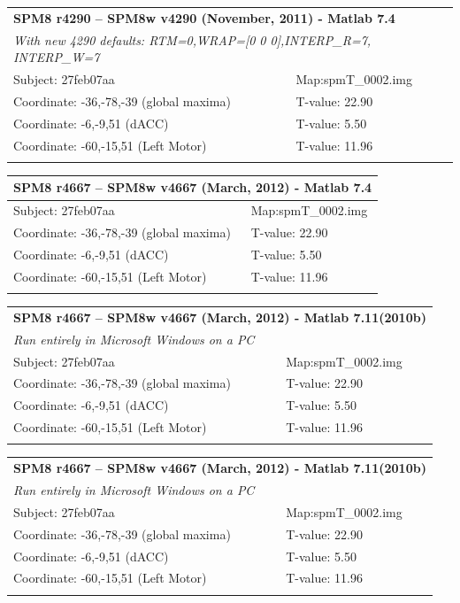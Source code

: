 \documentclass[12pt]{article}
\begin{document}
\begin{center}
\begin{tabular}{ll}
	\hline
	\multicolumn{2}{l}{\textbf{SPM8 r4290 -- SPM8w v4290 (November, 2011) - Matlab 7.4}}\\
	\multicolumn{2}{l}{\textit{With new 4290 defaults: RTM=0,WRAP=[0 0 0],INTERP\_R=7, INTERP\_W=7}}\\
	\hline
	Subject: 27feb07aa & Map:spmT\_0002.img\\
	\hline
	Coordinate: -36,-78,-39 (global maxima) & T-value: 22.90\\
	Coordinate: -6,-9,51 (dACC) & T-value: 5.50\\
	Coordinate: -60,-15,51 (Left Motor) & T-value: 11.96\\
	\hline \\
\end{tabular}

\begin{tabular}{ll}
	\hline
	\multicolumn{2}{l}{\textbf{SPM8 r4667 -- SPM8w v4667 (March, 2012) - Matlab 7.4}}\\
	\hline
	Subject: 27feb07aa & Map:spmT\_0002.img\\
	\hline
	Coordinate: -36,-78,-39 (global maxima) & T-value: 22.90\\
	Coordinate: -6,-9,51 (dACC) & T-value: 5.50\\
	Coordinate: -60,-15,51 (Left Motor) & T-value: 11.96\\
	\hline \\
\end{tabular}

\begin{tabular}{ll}
	\hline
	\multicolumn{2}{l}{\textbf{SPM8 r4667 -- SPM8w v4667 (March, 2012) - Matlab 7.11(2010b)}}\\
	\multicolumn{2}{l}{\textit{Run entirely in Microsoft Windows on a PC}}\\
	\hline
	Subject: 27feb07aa & Map:spmT\_0002.img \\
	\hline
	Coordinate: -36,-78,-39 (global maxima) & T-value: 22.90\\
	Coordinate: -6,-9,51 (dACC) & T-value: 5.50\\
	Coordinate: -60,-15,51 (Left Motor) & T-value: 11.96\\
	\hline \\
\end{tabular}

\begin{tabular}{ll}
	\hline
	\multicolumn{2}{l}{\textbf{SPM8 r4667 -- SPM8w v4667 (March, 2012) - Matlab 7.11(2010b)}}\\
	\multicolumn{2}{l}{\textit{Run entirely in Microsoft Windows on a PC}}\\
	\hline
	Subject: 27feb07aa & Map:spmT\_0002.img \\
	\hline
	Coordinate: -36,-78,-39 (global maxima) & T-value: 22.90\\
	Coordinate: -6,-9,51 (dACC) & T-value: 5.50\\
	Coordinate: -60,-15,51 (Left Motor) & T-value: 11.96\\
	\hline \\
\end{tabular}


\end{center}
\end{document}
